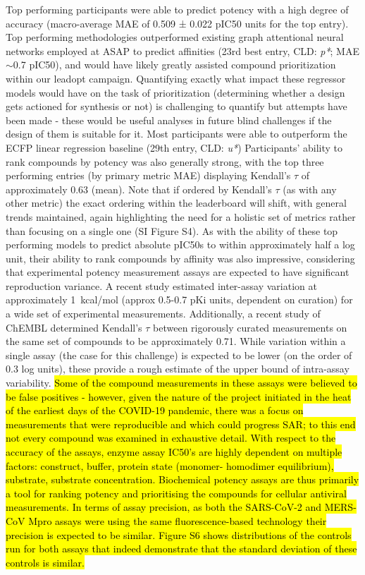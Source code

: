 \documentclass[journal=jcim,manuscript=article]{achemso}
\begin{document}
Top performing participants were able to predict potency with a high degree of accuracy (macro-average MAE of 0.509 ± 0.022 pIC50 units for the top entry). Top performing methodologies outperformed existing graph attentional neural networks employed at ASAP to predict affinities (23rd best entry, CLD: \textit{p*}; MAE$\sim$0.7 pIC50), and would have likely greatly assisted compound prioritization within our leadopt campaign. Quantifying exactly what impact these regressor models would have on the task of prioritization (determining whether a design gets actioned for synthesis or not) is challenging to quantify but attempts have been made - these would be useful analyses in future blind challenges if the design of them is suitable for it.\cite{ash_practically_2024} Most participants were able to outperform the ECFP linear regression baseline (29th entry, CLD: \textit{u*}) Participants' ability to rank compounds by potency was also generally strong, with the top three performing entries (by primary metric MAE) displaying Kendall's $\tau$ of approximately 0.63 (mean). Note that if ordered by Kendall's $\tau$ (as with any other metric) the exact ordering within the leaderboard will shift, with general trends maintained, again highlighting the need for a holistic set of metrics rather than focusing on a single one (SI Figure S4). As with the ability of these top performing models to predict absolute pIC50s to within approximately half a log unit, their ability to rank compounds by affinity was also impressive, considering that experimental potency measurement assays are expected to have significant reproduction variance. A recent study estimated inter-assay variation at approximately 1~kcal/mol (approx 0.5-0.7 pKi units, dependent on curation)\cite{ross_maximal_2023} for a wide set of experimental measurements. Additionally, a recent study of ChEMBL\cite{landrum_combining_2024} determined Kendall's $\tau$ between rigorously curated measurements on the same set of compounds to be approximately 0.71. While variation within a single assay (the case for this challenge) is expected to be lower (on the order of 0.3 log units\cite{ross_maximal_2023}), these provide a rough estimate of the upper bound of intra-assay variability. \hl{Some of the compound measurements in these assays were believed to be false positives - however, given the nature of the project initiated in the heat of the earliest days of the COVID-19 pandemic, there was a focus on measurements that were reproducible and which could progress SAR; to this end not every compound was examined in exhaustive detail. With respect to the accuracy of the assays, enzyme assay IC50's are highly dependent on multiple factors: construct, buffer, protein state (monomer- homodimer equilibrium), substrate, substrate concentration. Biochemical potency assays are thus primarily a tool for ranking potency and prioritising the compounds for cellular antiviral measurements. In terms of assay precision, as both the SARS-CoV-2 and MERS-CoV Mpro assays were using the same fluorescence-based technology their precision is expected to be similar. Figure S6 shows distributions of the controls run for both assays that indeed demonstrate that the standard deviation of these controls is similar.}
\end{document}
